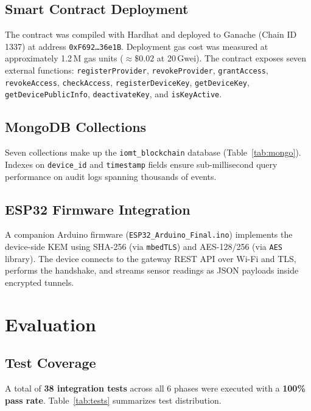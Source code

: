 \documentclass[conference]{IEEEtran}
\begin{document}
\subsection{Smart Contract Deployment}
The contract was compiled with Hardhat and deployed to Ganache (Chain ID 1337) at
address \texttt{0xF692\ldots36e1B}. Deployment gas cost was measured at approximately
1.2\,M gas units ($\approx\$0.02$ at 20\,Gwei). The contract exposes seven external functions:
\texttt{registerProvider}, \texttt{revokeProvider}, \texttt{grantAccess},
\texttt{revokeAccess}, \texttt{checkAccess}, \texttt{registerDeviceKey},
\texttt{getDeviceKey}, \texttt{getDevicePublicInfo}, \texttt{deactivateKey}, and
\texttt{isKeyActive}.

\subsection{MongoDB Collections}
Seven collections make up the \texttt{iomt\_blockchain} database (Table~\ref{tab:mongo}).
Indexes on \texttt{device\_id} and \texttt{timestamp} fields ensure sub-millisecond
query performance on audit logs spanning thousands of events.

\subsection{ESP32 Firmware Integration}
A companion Arduino firmware (\texttt{ESP32\_Arduino\_Final.ino}) implements the
device-side KEM using SHA-256 (via \texttt{mbedTLS}) and AES-128/256 (via
\texttt{AES} library). The device connects to the gateway REST API over Wi-Fi and TLS,
performs the handshake, and streams sensor readings as JSON payloads inside encrypted
tunnels.

\section{Evaluation}
\label{sec:evaluation}

\subsection{Test Coverage}
A total of \textbf{38 integration tests} across all 6 phases were executed with a
\textbf{100\% pass rate}. Table~\ref{tab:tests} summarizes test distribution.
\end{document}
